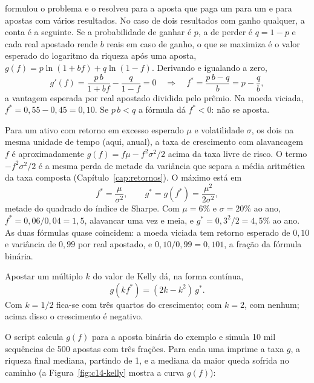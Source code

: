 \citet{kelly1956} formulou o problema e o resolveu para a aposta que paga um para um e para apostas com vários resultados. No caso de dois resultados com ganho qualquer, a conta é a seguinte. Se a probabilidade de ganhar é $p$, a de perder é $q = 1 - p$ e cada real apostado rende $b$ reais em caso de ganho, o que se maximiza é o valor esperado do logaritmo da riqueza após uma aposta, $g(f) = p \ln(1 + b f) + q \ln(1 - f)$. Derivando e igualando a zero,
\begin{equation}
  g'(f) = \frac{p\,b}{1 + b f} - \frac{q}{1 - f} = 0
  \quad\Longrightarrow\quad
  f^{*} = \frac{p\,b - q}{b} = p - \frac{q}{b} ,
  \label{eq:c14-kelly}
\end{equation}
a vantagem esperada por real apostado dividida pelo prêmio. Na moeda viciada, $f^{*} = 0,55 - 0,45 = 0,10$. Se $p\,b < q$ a fórmula dá $f^{*} < 0$: não se aposta.

Para um ativo com retorno em excesso esperado $\mu$ e volatilidade $\sigma$, os dois na mesma unidade de tempo (aqui, anual), a taxa de crescimento com alavancagem $f$ é aproximadamente $g(f) = f\mu - f^{2}\sigma^{2}/2$ acima da taxa livre de risco. O termo $-f^{2}\sigma^{2}/2$ é a mesma perda de metade da variância que separa a média aritmética da taxa composta (Capítulo~\ref{cap:retornos}). O máximo está em
\begin{equation}
  f^{*} = \frac{\mu}{\sigma^{2}} , \qquad g^{*} = g(f^{*}) = \frac{\mu^{2}}{2\sigma^{2}} ,
  \label{eq:c14-kelly-cont}
\end{equation}
metade do quadrado do índice de Sharpe. Com $\mu = 6\%$ e $\sigma = 20\%$ ao ano, $f^{*} = 0,06 / 0,04 = 1,5$, alavancar uma vez e meia, e $g^{*} = 0,3^{2}/2 = 4,5\%$ ao ano. As duas fórmulas quase coincidem: a moeda viciada tem retorno esperado de $0,10$ e variância de $0,99$ por real apostado, e $0,10 / 0,99 = 0,101$, a fração da fórmula binária.

Apostar um múltiplo $k$ do valor de Kelly dá, na forma contínua,
\begin{equation}
  g(k f^{*}) = (2k - k^{2})\, g^{*} .
  \label{eq:c14-kelly-k}
\end{equation}
Com $k = 1/2$ fica-se com três quartos do crescimento; com $k = 2$, com nenhum; acima disso o crescimento é negativo.

O script  calcula $g(f)$ para a aposta binária do exemplo e simula 10 mil sequências de 500 apostas com três frações. Para cada uma imprime a taxa $g$, a riqueza final mediana, partindo de 1, e a mediana da maior queda sofrida no caminho (a Figura~\ref{fig:c14-kelly} mostra a curva $g(f)$):

